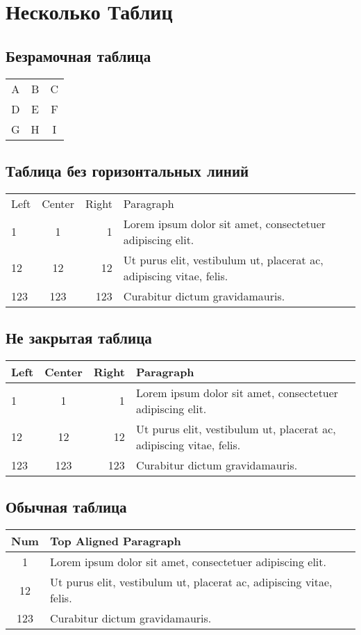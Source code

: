 \section{Несколько Таблиц}

\subsection{Безрамочная таблица}
\begin{tabular}{c c c}
    A & B & C \\
    D & E & F \\
    G & H & I \\
\end{tabular}

\subsection{Таблица без горизонтальных линий}
\begin{tabular}{||l|c|r|p{6cm}||}
    Left & Center & Right & Paragraph \\
    1 & 1 & 1 & Lorem ipsum dolor sit amet, consectetuer adipiscing elit. \\
    12 & 12 & 12 & Ut purus elit, vestibulum ut, placerat ac, adipiscing vitae, felis. \\
    123 & 123 & 123 & Curabitur dictum gravidamauris. \\
\end{tabular}

\subsection{Не закрытая таблица}
\begin{tabular}{||l|c|r|p{6cm}||}
    \cline{1-3}
    Left & Center & Right & Paragraph \\
    \hline \hline
    1 & 1 & 1 & Lorem ipsum dolor sit amet, consectetuer adipiscing elit. \\
    \hline
    12 & 12 & 12 & Ut purus elit, vestibulum ut, placerat ac, adipiscing vitae, felis. \\
    \hline
    123 & 123 & 123 & Curabitur dictum gravidamauris. \\ [.3cm]
    \cline{4-4}
\end{tabular}

\subsection{Обычная таблица}
\begin{tabular}{|c|p{6cm}|}
    \hline
    Num & Top Aligned Paragraph\\
    \hline
    1 & Lorem ipsum dolor sit amet, consectetuer adipiscing elit. \\
    \hline
    12 & Ut purus elit, vestibulum ut, placerat ac, adipiscing vitae, felis. \\
    \hline
    123 & Curabitur dictum gravidamauris. \\
    \hline
\end{tabular}

